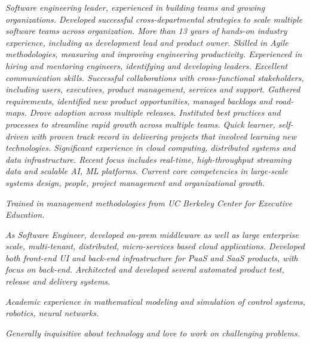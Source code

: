 {\selectfont
	\begin{justify}\textit{Software engineering leader, experienced in building teams and growing organizations. Developed successful cross-departmental strategies to scale multiple software teams across organization. More than 13 years of hands-on industry experience, including as development lead and product owner. Skilled in Agile methodologies, measuring and improving engineering productivity. Experienced in hiring and mentoring engineers, identifying and developing leaders. Excellent communication skills. Successful collaborations with cross-functional stakeholders, including users, executives, product management, services and support. Gathered requirements, identified new product opportunities, managed backlogs and road-maps. Drove adoption across multiple releases. Instituted best practices and processes to streamline rapid growth across multiple teams. Quick learner, self-driven with proven track record in delivering projects that involved learning new technologies. Significant experience in cloud computing, distributed systems and data infrastructure. Recent focus includes real-time, high-throughput streaming data and scalable AI, ML platforms. Current core competencies in large-scale systems design, people, project management and organizational growth.}\end{justify}
	
	\begin{justify}\textit{Trained in management methodologies from UC Berkeley Center for Executive Education.}\end{justify}
	
	\begin{justify}\textit{As Software Engineer, developed on-prem middleware as well as large enterprise scale, multi-tenant, distributed, micro-services based cloud applications. Developed both front-end UI and back-end infrastructure for PaaS and SaaS products, with focus on back-end. Architected and developed several automated product test, release and delivery systems.}\end{justify}

	\begin{justify}\textit{Academic experience in mathematical modeling and simulation of control systems, robotics, neural networks.}\end{justify}

	\begin{justify}\textit{Generally inquisitive about technology and love to work on challenging problems.}\end{justify}
}
\vspace{-12pt}